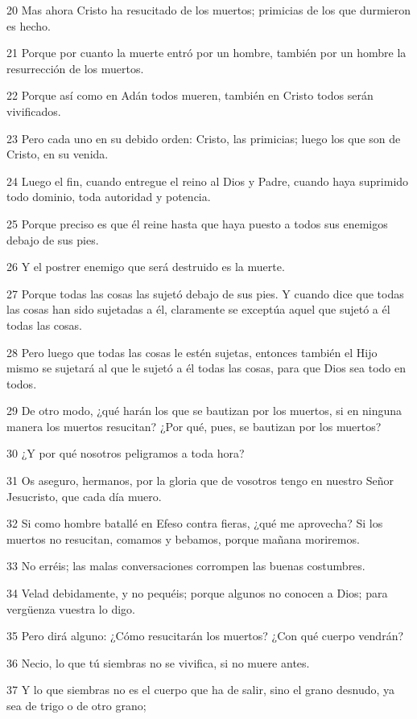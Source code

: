 \par 20 Mas ahora Cristo ha resucitado de los muertos; primicias de los que durmieron es hecho.
\par 21 Porque por cuanto la muerte entró por un hombre, también por un hombre la resurrección de los muertos.
\par 22 Porque así como en Adán todos mueren, también en Cristo todos serán vivificados.
\par 23 Pero cada uno en su debido orden: Cristo, las primicias; luego los que son de Cristo, en su venida.
\par 24 Luego el fin, cuando entregue el reino al Dios y Padre, cuando haya suprimido todo dominio, toda autoridad y potencia.
\par 25 Porque preciso es que él reine hasta que haya puesto a todos sus enemigos debajo de sus pies.
\par 26 Y el postrer enemigo que será destruido es la muerte.
\par 27 Porque todas las cosas las sujetó debajo de sus pies. Y cuando dice que todas las cosas han sido sujetadas a él, claramente se exceptúa aquel que sujetó a él todas las cosas.
\par 28 Pero luego que todas las cosas le estén sujetas, entonces también el Hijo mismo se sujetará al que le sujetó a él todas las cosas, para que Dios sea todo en todos.
\par 29 De otro modo, ¿qué harán los que se bautizan por los muertos, si en ninguna manera los muertos resucitan? ¿Por qué, pues, se bautizan por los muertos?
\par 30 ¿Y por qué nosotros peligramos a toda hora?
\par 31 Os aseguro, hermanos, por la gloria que de vosotros tengo en nuestro Señor Jesucristo, que cada día muero.
\par 32 Si como hombre batallé en Efeso contra fieras, ¿qué me aprovecha? Si los muertos no resucitan, comamos y bebamos, porque mañana moriremos.
\par 33 No erréis; las malas conversaciones corrompen las buenas costumbres.
\par 34 Velad debidamente, y no pequéis; porque algunos no conocen a Dios; para vergüenza vuestra lo digo.
\par 35 Pero dirá alguno: ¿Cómo resucitarán los muertos? ¿Con qué cuerpo vendrán?
\par 36 Necio, lo que tú siembras no se vivifica, si no muere antes.
\par 37 Y lo que siembras no es el cuerpo que ha de salir, sino el grano desnudo, ya sea de trigo o de otro grano;
